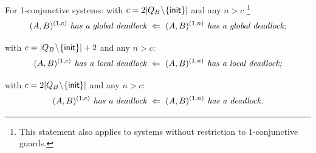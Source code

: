 \begin{lemma} \label{le:ConjunctiveBoundingLemmaDeadlocks}
For 1-conjunctive systems:
\li
  \- with $c=2|Q_B\!\setminus\! \{ {\sf init} \}|$ and any $n>c$ \footnote{This statement also applies to systems without restriction to $1$-conjunctive guards.}
  $$(A,B)^{(1,c)} \textit{ has a global deadlock} \ \Implied\ (A,B)^{(1,n)} \textit{ has a global deadlock;} $$
  
  \- with $c=|Q_B\!\setminus\! \{ {\sf init} \}|+2$ and any $n>c$:
  $$(A,B)^{(1,c)} \textit{ has a local deadlock} \ \Leftarrow\ (A,B)^{(1,n)} \textit{ has a local deadlock;}$$
  
  \- with $c=2|Q_B\!\setminus\! \{ {\sf init} \}|$ and any $n>c$:
  $$(A,B)^{(1,c)} \textit{ has a deadlock} \ \Implied\ (A,B)^{(1,n)} \textit{ has a deadlock.}$$
\il
\end{lemma}
